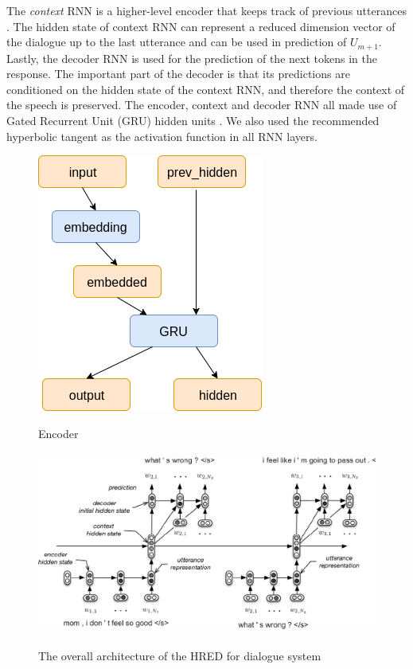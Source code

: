  The \textit{context} RNN is a higher-level encoder that keeps track of previous utterances \cite{DBLP:journals/corr/SerbanSBCP15}.  The hidden state of context RNN can represent a reduced dimension vector of the dialogue up to the last utterance and can be used in prediction of $U_{m+1}$. Lastly, the decoder RNN is used for the prediction of the next tokens in the response. The important part of the decoder is that its predictions are conditioned on the hidden state of the context RNN, and therefore the context of the speech is preserved. The encoder, context and decoder RNN all made use of Gated Recurrent Unit (GRU) hidden units \cite{DBLP:journals/corr/BahdanauCB14}. We also used the recommended hyperbolic tangent as the activation function in all RNN layers. \vspace{-0.75em}
\begin{figure}[!ht]
	\centering
  	\caption{Encoder}
	\includegraphics[scale=0.5]{img/encoder-network}
  	\label{fig:encoder}
\end{figure}

\begin{figure}[!ht]
	\centering
  	\caption{The overall architecture of the HRED for dialogue system \cite{DBLP:journals/corr/SerbanSBCP15} }
	\includegraphics[width=\textwidth, height=6cm]{img/HRED}
  	\label{fig:hred}
\end{figure}

